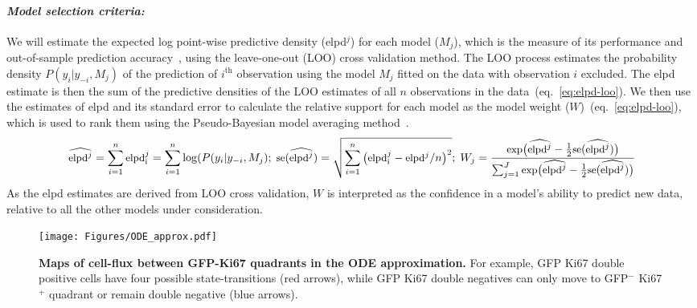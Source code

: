 \documentclass[11pt]{article}
\newcommand{\para}[1]{\vspace*{-4.5mm}\paragraph{#1}}
\begin{document}
\para{\textit{Model selection criteria:}}
We will estimate the expected log point-wise predictive density (elpd$^{j}$) for each model ($M_{j}$), which is the measure of its performance and out-of-sample prediction accuracy~\citep{Vehtari:2016}, using the leave-one-out (LOO) cross validation method. 
The LOO process estimates the probability density $P(y_i | y_{-i}, M_j)$ of the prediction of $i^\text{th}$ observation using the model $M_j$ fitted on the data with observation $i$ excluded.
The elpd estimate is then the sum of the predictive densities of the LOO estimates of all $n$ observations in the data~(eq.~\ref{eq:elpd-loo}).
We then use the estimates of {elpd} and its standard error to calculate the relative support for each model as the model weight ($W$)~(eq.~\ref{eq:elpd-loo}), which is used to rank them using the Pseudo-Bayesian model averaging method~\citep{Yao:2018}.
\begin{equation} 
\small
\widehat{\text{elpd}^j} = \sum_{i=1}^n  \text{elpd}^j_\text{i}  = \sum_{i=1}^n \log(P(y_i | y_{-i}, M_j); \; 
\text{se}(\widehat{\text{elpd}^j})  = \sqrt{\sum_{i=1}^n  \big(\text{elpd}^j_\text{i} - \text{elpd}^j/n \big)^2 }; \;
W_j = \frac{\text{exp}\big(\widehat{\text{elpd}^j} - \frac{1}{2}\text{se}(\widehat{\text{elpd}^j})\big)}{\sum_{j=1}^J \text{exp}\big(\widehat{\text{elpd}^j} - \frac{1}{2}\text{se}(\widehat{\text{elpd}^j})\big)}
\label{eq:elpd-loo}
\end{equation}
As the {elpd} estimates are derived from LOO cross validation, $W$ is interpreted as the confidence in a model's ability to predict new data, relative to all the other models under consideration.

\begin{wrapfigure}{r}{0.24\textwidth}
\centering
\vspace*{-4mm}
\texttt{[image: Figures/ODE\_approx.pdf]}
\vspace*{-7mm}
\caption{\textbf{Maps of cell-flux between GFP-Ki67 quadrants in the ODE approximation.} 
For example, GFP Ki67 double positive cells have four possible state-transitions (red arrows), while GFP Ki67 double negatives can only move to GFP$^-$ Ki67$^+$ quadrant or remain double negative (blue arrows).}
\vspace*{-6mm}
\label{fig:ode_approx}
\end{wrapfigure}
\end{document}

